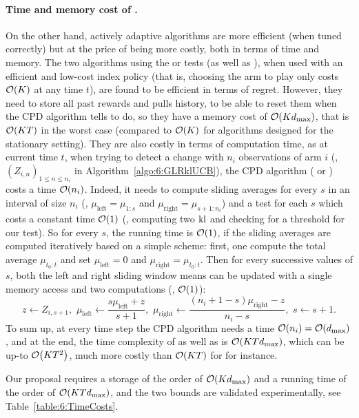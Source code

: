 \paragraph{Time and memory cost of \GLRklUCB.}
%
On the other hand, actively adaptive algorithms are more efficient (when tuned correctly) but at the price of being more costly, both in terms of time and memory.
The two algorithms using the \CUSUM{} or \GLR{} tests (as well as \PHT), when used with an efficient and low-cost index policy (that is, choosing the arm to play only costs $\mathop{}\mathopen{}\mathcal{O}\mathopen{}\left(K\right)$ at any time $t$), are found to be efficient in terms of regret.
However, they need to store all past rewards and pulls history, to be able to reset them when the CPD algorithm tells to do, so they have a memory cost of $\mathop{}\mathopen{}\mathcal{O}\mathopen{}\left(K d_{\max}\right)$, that is $\mathop{}\mathopen{}\mathcal{O}\mathopen{}\left(K T\right)$ in the worst case (compared to $\mathop{}\mathopen{}\mathcal{O}\mathopen{}\left(K\right)$ for algorithms designed for the stationary setting).
%
They are also costly in terms of computation time, as at current time $t$, when trying to detect a change with $n_i$ observations of arm $i$ (\ie, $(Z_{i,n})_{1\leq n \leq n_i}$ in Algorithm~\ref{algo:6:GLRklUCB}), the CPD algorithm (\CUSUM{} or \GLR) costs a time $\mathop{}\mathopen{}\mathcal{O}\mathopen{}\left(n_i\right)$.
Indeed, it needs to compute sliding averages for every $s$ in an interval of size $n_i$ (\ie, $\mu_{\text{left}}=\mu_{1:s}$ and $\mu_{\text{right}}=\mu_{s+1:n_i}$) and a test for each $s$ which costs a constant time $\mathop{}\mathopen{}\mathcal{O}\mathopen{}\left(1\right)$ (\eg, computing two $\mathrm{kl}$ and checking for a threshold for our \GLR{} test).
So for every $s$, the running time is $\mathop{}\mathopen{}\mathcal{O}\mathopen{}\left(1\right)$, if the sliding averages are computed iteratively based on a simple scheme: first, one compute the total average $\mu_{t_0:t}$ and set $\mu_{\text{left}}=0$ and $\mu_{\text{right}}=\mu_{t_0:t}$. Then for every successive values of $s$, both the left and right sliding window means can be updated with a single memory access and two computations (\ie, $\mathop{}\mathopen{}\mathcal{O}\mathopen{}\left(1\right)$):
%
\begin{equation}
    z \leftarrow Z_{i, s + 1},\,\,
    \mu_{\text{left}} \leftarrow \frac{s \mu_{\text{left}} + z}{s + 1},\,\,
    \mu_{\text{right}} \leftarrow \frac{(n_i + 1 - s) \mu_{\text{right}} - z}{n_i - s},\,\,
    s \leftarrow s + 1.
\end{equation}
%
To sum up, at every time step the CPD algorithm needs a time $\mathop{}\mathopen{}\mathcal{O}\mathopen{}\left(n_i\right)=\mathop{}\mathopen{}\mathcal{O}\mathopen{}\left(d_{\max}\right)$, and at the end, the time complexity of \CUSUMklUCB{} as well as \GLRklUCB{} is $\mathop{}\mathopen{}\mathcal{O}\mathopen{}\left(K T d_{\max}\right)$, which can be up-to $\mathop{}\mathopen{}\mathcal{O}\mathopen{}\left(K T^2\right)$, much more costly than $\mathop{}\mathopen{}\mathcal{O}\mathopen{}\left(K T\right)$ for \klUCB{} for instance.

Our proposal \GLRklUCB{} requires a storage of the order of $\mathop{}\mathopen{}\mathcal{O}\mathopen{}\left(K d_{\max}\right)$ and a running time of the order of $\mathop{}\mathopen{}\mathcal{O}\mathopen{}\left(K T d_{\max}\right)$, and the two bounds are validated experimentally, see Table~\ref{table:6:TimeCosts}.

